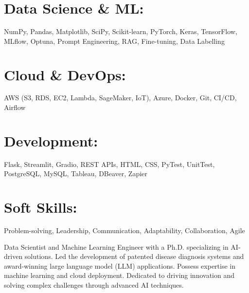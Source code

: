 \documentclass[print]{cv-style}          %
\begin{document}
\begin{aside}
\section{Data Science \& ML:}
NumPy, Pandas, Matplotlib, SciPy, Scikit-learn, PyTorch, Keras, TensorFlow, MLflow, Optuna, Prompt Engineering, RAG, Fine-tuning, Data Labelling

\section{Cloud \& DevOps:}
AWS (S3, RDS, EC2, Lambda, SageMaker, IoT), Azure, Docker, Git, CI/CD, Airflow

\section{Development:}
Flask, Streamlit, Gradio, REST APIs, HTML, CSS, PyTest, UnitTest, PostgreSQL, MySQL, Tableau, DBeaver, Zapier

\section{Soft Skills:}
Problem-solving, Leadership, Communication, Adaptability, Collaboration, Agile

\end{aside}

\vspace{-0.4cm} %
Data Scientist and Machine Learning Engineer with a Ph.D. specializing in AI-driven solutions. Led the development of patented disease diagnosis systems and award-winning large language model (LLM) applications. Possess expertise in machine learning and cloud deployment. Dedicated to driving innovation and solving complex challenges through advanced AI techniques.
\vspace{0.3cm}
\vspace{-0.4cm}
\end{document}
